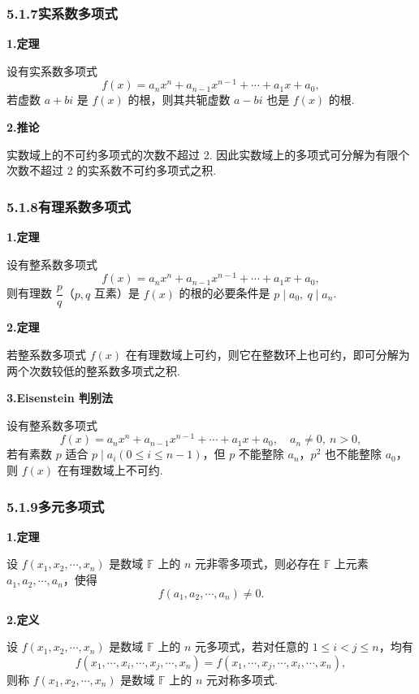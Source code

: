 \documentclass[UTF8,12pt,a4paper,fontset=fandol]{ctexart}
\begin{document}
\subsubsection*{5.1.7\quad 实系数多项式}

\noindent\textbf{1.\quad 定理}

设有实系数多项式
\[
f(x)=a_nx^n+a_{n-1}x^{n-1}+\cdots+a_1x+a_0,
\]
若虚数 $a+bi$ 是 $f(x)$ 的根，则其共轭虚数 $a-bi$ 也是 $f(x)$ 的根.

\noindent\textbf{2.\quad 推论}

实数域上的不可约多项式的次数不超过 2. 因此实数域上的多项式可分解为有限个次数不超过 2 的实系数不可约多项式之积.

\subsubsection*{5.1.8\quad 有理系数多项式}

\noindent\textbf{1.\quad 定理}

设有整系数多项式
\[
f(x)=a_nx^n+a_{n-1}x^{n-1}+\cdots+a_1x+a_0,
\]
则有理数 $\dfrac{p}{q}$（$p,q$ 互素）是 $f(x)$ 的根的必要条件是 $p\mid a_0,\ q\mid a_n$.

\noindent\textbf{2.\quad 定理}

若整系数多项式 $f(x)$ 在有理数域上可约，则它在整数环上也可约，即可分解为两个次数较低的整系数多项式之积.

\noindent\textbf{3.\quad Eisenstein 判别法}

设有整系数多项式
\[
f(x)=a_nx^n+a_{n-1}x^{n-1}+\cdots+a_1x+a_0,\quad a_n\ne0,\ n>0,
\]
若有素数 $p$ 适合 $p\mid a_i(0\le i\le n-1)$，但 $p$ 不能整除 $a_n$，$p^2$ 也不能整除 $a_0$，则 $f(x)$ 在有理数域上不可约.

\subsubsection*{5.1.9\quad 多元多项式}

\noindent\textbf{1.\quad 定理}

设 $f(x_1,x_2,\cdots,x_n)$ 是数域 $\mathbb{F}$ 上的 $n$ 元非零多项式，则必存在 $\mathbb{F}$ 上元素 $a_1,a_2,\cdots,a_n$，使得
\[
f(a_1,a_2,\cdots,a_n)\ne0.
\]

\noindent\textbf{2.\quad 定义}

设 $f(x_1,x_2,\cdots,x_n)$ 是数域 $\mathbb{F}$ 上的 $n$ 元多项式，若对任意的 $1\le i<j\le n$，均有
\[
f(x_1,\cdots,x_i,\cdots,x_j,\cdots,x_n)
=f(x_1,\cdots,x_j,\cdots,x_i,\cdots,x_n),
\]
则称 $f(x_1,x_2,\cdots,x_n)$ 是数域 $\mathbb{F}$ 上的 $n$ 元对称多项式.
\end{document}
